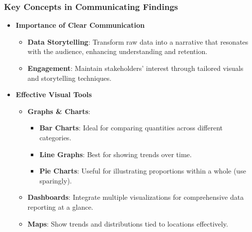 \documentclass[aspectratio=169]{beamer}
\begin{document}
\begin{frame}[fragile]
    \frametitle{Key Concepts in Communicating Findings}
    \begin{itemize}
        \item \textbf{Importance of Clear Communication}
            \begin{itemize}
                \item \textbf{Data Storytelling}: Transform raw data into a narrative that resonates with the audience, enhancing understanding and retention.
                \item \textbf{Engagement}: Maintain stakeholders' interest through tailored visuals and storytelling techniques.
            \end{itemize}

        \item \textbf{Effective Visual Tools}
            \begin{itemize}
                \item \textbf{Graphs \& Charts}:
                    \begin{itemize}
                        \item \textbf{Bar Charts}: Ideal for comparing quantities across different categories.
                        \item \textbf{Line Graphs}: Best for showing trends over time.
                        \item \textbf{Pie Charts}: Useful for illustrating proportions within a whole (use sparingly).
                    \end{itemize}
                \item \textbf{Dashboards}: Integrate multiple visualizations for comprehensive data reporting at a glance.
                \item \textbf{Maps}: Show trends and distributions tied to locations effectively.
            \end{itemize}
    \end{itemize}
\end{frame}
\end{document}
